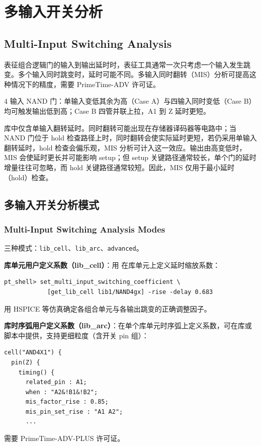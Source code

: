 \section{多输入开关分析}
\subsection*{Multi-Input Switching Analysis}

表征组合逻辑门的输入到输出延时时，表征工具通常一次只考虑一个输入发生跳变。多个输入同时跳变时，延时可能不同。多输入同时翻转（MIS）分析可提高这种情况下的精度，需要 PrimeTime-ADV 许可证。

4 输入 NAND 门：单输入变低其余为高（Case A）与四输入同时变低（Case B）均可触发输出低到高；Case B 四管并联上拉，A1 到 Z 延时更短。


库中仅含单输入翻转延时。同时翻转可能出现在存储器译码器等电路中；当 NAND 门位于 hold 检查路径上时，同时翻转会使实际延时更短，若仍采用单输入翻转延时，hold 检查会偏乐观，MIS 分析可计入这一效应。输出由高变低时，MIS 会使延时更长并可能影响 setup；但 setup 关键路径通常较长，单个门的延时增量往往可忽略，而 hold 关键路径通常较短。因此，MIS 仅用于最小延时（hold）检查。

\subsection{多输入开关分析模式}
\subsubsection*{Multi-Input Switching Analysis Modes}

三种模式：\texttt{lib\_cell}、\texttt{lib\_arc}、\texttt{advanced}。

\textbf{库单元用户定义系数（lib\_cell）}：用  在库单元上定义延时缩放系数：
\begin{lstlisting}
pt_shell> set_multi_input_switching_coefficient \
            [get_lib_cell lib1/NAND4gx] -rise -delay 0.683
\end{lstlisting}
用 HSPICE 等仿真确定各组合单元与各输出跳变的正确调整因子。

\textbf{库时序弧用户定义系数（lib\_arc）}：在单个库单元时序弧上定义系数，可在库或脚本中提供，支持更细粒度（含开关 pin 组）：
\begin{lstlisting}
cell("AND4X1") {
  pin(Z) {
    timing() {
      related_pin : A1;
      when : "A2&!B1&!B2";
      mis_factor_rise : 0.85;
      mis_pin_set_rise : "A1 A2";
      ...
\end{lstlisting}
需要 PrimeTime-ADV-PLUS 许可证。

